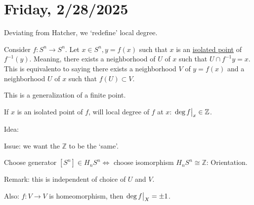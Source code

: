 \documentclass{article}
\theoremstyle{definition}
\begin{document}
    \section*{Friday, 2/28/2025}
    
    Deviating from Hatcher, we `redefine' local degree.

    Consider \(f: S^n \to S^n\). Let \(x\in S^n, y=f(x)\) such that \(x\) is an \underline{isolated point} of \(f ^{-1} (y)\). Meaning, there exists a neighborhood of \(U\) of \(x\) such that \(U \cap f ^{-1} y = x\). This is equivalento to saying there exists a neighborhood \(V\) of \(y = f(x)\) and a neighborhood \(U\) of \(x\) such that \(f(U) \subset V\).
    
    This is a generalization of a finite point.

    If \(x\) is an isolated point of \(f\), will local degree of \(f\) at \(x\): \(\eval{\deg f}_x \in \mathbb{Z}\).

    Idea:

    \begin{center}
    \end{center}

    Issue: we want the \(\mathbb{Z}\) to be the `same'.

    Choose generator \([S^n]\in H_n S^n \iff\) choose isomorphism \(H_n S^n \cong \mathbb{Z}\): Orientation.

    \begin{center}
    \end{center}

    Remark: this is independent of choice of \(U\) and \(V\).

    Also: \(f: V \to V\) is homeomorphism, then \(\eval{\deg f}_X = \pm 1\).
\end{document}
